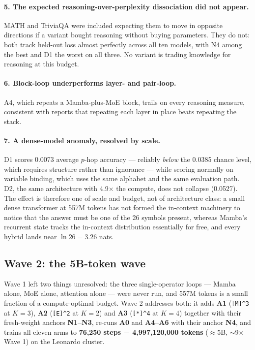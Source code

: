 \documentclass[11pt,a4paper]{article}
\newcommand{\lp}[1]{\texttt{#1}}
\newcommand{\caret}{\textasciicircum}
\begin{document}
\paragraph{5. The expected reasoning-over-perplexity dissociation did not appear.} MATH and
TriviaQA were included expecting them to move in opposite directions if a variant bought reasoning
without buying parameters. They do not: both track held-out loss almost perfectly across all ten
models, with N4 among the best and D1 the worst on all three. No variant is trading knowledge for
reasoning at this budget.

\paragraph{6. Block-loop underperforms layer- and pair-loop.} A4, which repeats a Mamba-plus-MoE
block, trails on every reasoning measure, consistent with reports that repeating each layer in
place beats repeating the stack.

\paragraph{7. A dense-model anomaly, resolved by scale.} D1 scores 0.0073 average $p$-hop accuracy
--- reliably \emph{below} the 0.0385 chance level, which requires structure rather than ignorance
--- while scoring normally on variable binding, which uses the same alphabet and the same
evaluation path. D2, the same architecture with 4.9$\times$ the compute, does not collapse
(0.0527). The effect is therefore one of scale and budget, not of architecture class: a small dense
transformer at 557M tokens has not formed the in-context machinery to notice that the answer must
be one of the 26 symbols present, whereas Mamba's recurrent state tracks the in-context
distribution essentially for free, and every hybrid lands near $\ln 26 = 3.26$ nats.

\subsection{Wave 2: the 5B-token wave}
\label{sec:wave2}

Wave 1 left two things unresolved: the three single-operator loops --- Mamba alone, MoE alone,
attention alone --- were never run, and 557M tokens is a small fraction of a compute-optimal budget.
Wave 2 addresses both: it adds \textbf{A1} (\lp{[M]\caret3} at $K{=}3$), \textbf{A2}
(\lp{[E]\caret2} at $K{=}2$) and \textbf{A3} (\lp{[*]\caret4} at $K{=}4$) together with their
fresh-weight anchors \textbf{N1--N3}, re-runs \textbf{A0} and \textbf{A4--A6} with their anchor
\textbf{N4}, and trains all eleven arms to \textbf{76{,}250 steps = 4{,}997{,}120{,}000 tokens}
($\approx$5B, $\sim$9$\times$ Wave 1) on the Leonardo cluster.
\end{document}

